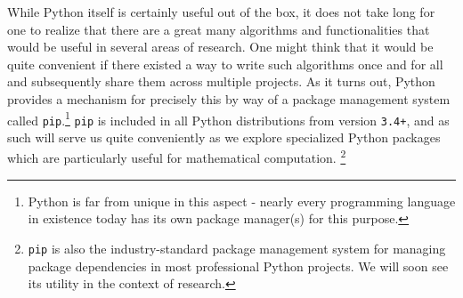 \documentclass[12pt]{article}
\begin{document}
While Python itself is certainly useful out of the box, it does not take long for one to realize that there are a great
many algorithms and functionalities that would be useful in several areas of research. One might think that it would be
quite convenient if there existed a way to write such algorithms once and for all and subsequently share them across
multiple projects. As it turns out, Python provides a mechanism for precisely this by way of a package
management system called \texttt{pip}.\footnote{
    Python is far from unique in this aspect - nearly every programming language in existence today has its own package
    manager(s) for this purpose.
} \texttt{pip} is included in all Python distributions from version \texttt{3.4+}, and as such will serve us quite
conveniently as we explore specialized Python packages which are particularly useful for mathematical computation.
\footnote{
    \texttt{pip} is also the industry-standard package management system for managing package dependencies in 
    most professional Python projects. We will soon see its utility in the context of research.
}
\end{document}
